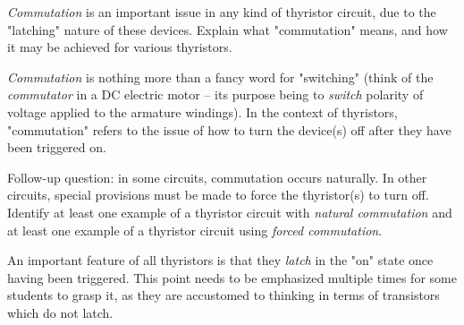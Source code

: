 

{\it Commutation} is an important issue in any kind of thyristor circuit, due to the "latching" nature of these devices.  Explain what "commutation" means, and how it may be achieved for various thyristors.







{\it Commutation} is nothing more than a fancy word for "switching" (think of the {\it commutator} in a DC electric motor -- its purpose being to {\it switch} polarity of voltage applied to the armature windings).  In the context of thyristors, "commutation" refers to the issue of how to turn the device(s) off after they have been triggered on.

\vskip 10pt

Follow-up question: in some circuits, commutation occurs naturally.  In other circuits, special provisions must be made to force the thyristor(s) to turn off.  Identify at least one example of a thyristor circuit with {\it natural commutation} and at least one example of a thyristor circuit using {\it forced commutation}.







An important feature of all thyristors is that they {\it latch} in the "on" state once having been triggered.  This point needs to be emphasized multiple times for some students to grasp it, as they are accustomed to thinking in terms of transistors which do not latch.




